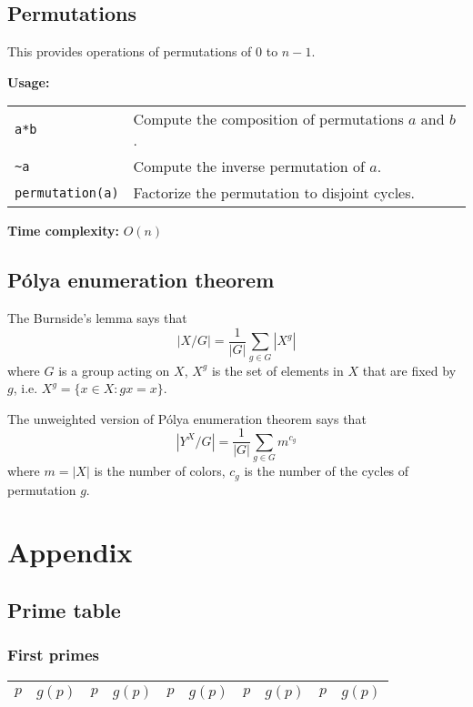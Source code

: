 \subsection{Permutations}
This provides operations of permutations of $0$ to $n-1$. \par
\textbf{Usage:} \\[0.1cm]
\begin{tabular}{p{3cm} p{8.5cm}}
  \lstinline|a*b| & Compute the composition of permutations $a$ and $b$. \\
  \lstinline|~a| & Compute the inverse permutation of $a$. \\
  \lstinline|permutation(a)| & Factorize the permutation to disjoint cycles.
\end{tabular} \par
\textbf{Time complexity:} $O(n)$ \par


\subsection{P\'olya enumeration theorem}
The Burnside's lemma says that
$$ |X / G| = \frac{1}{|G|} \sum_{g \in G} |X^g| $$
where $G$ is a group acting on $X$, $X^g$ is the set of elements in $X$ that are fixed by $g$, i.e. $X^g = \{x \in X : gx = x\}$. \par
The unweighted version of P\'olya enumeration theorem says that
$$ |Y^X / G| = \frac{1}{|G|} \sum_{g \in G} m^{c_g} $$
where $m = |X|$ is the number of colors, $c_g$ is the number of the cycles of permutation $g$.

\newpage
\section{Appendix}
\subsection{Prime table}
\subsubsection{First primes}
\begin{table}[h]
  \centering
  \begin{tabular}{|c|c|c|c|c|c|c|c|c|c|}
  \hline
  $p$ & $g(p)$ & $p$ & $g(p)$ & $p$ & $g(p)$ & $p$ & $g(p)$ & $p$ & $g(p)$ \\ \hline
   \hline
  \end{tabular}
\end{table}

